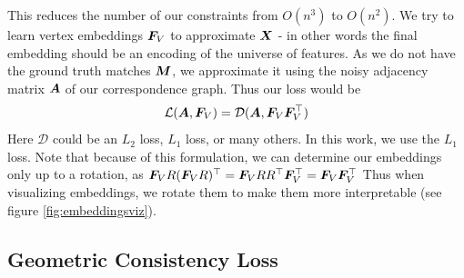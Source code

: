 \documentclass{article} %
\begin{document}
This reduces the number of our constraints from $O(n^3)$ to $O(n^2)$.
We try to learn vertex embeddings ${\bm{F}}_V$ to approximate ${\bm{X}}$ - in other words the final embedding should be an encoding of the universe of features.
As we do not have the ground truth matches ${\bm{M}}$, we approximate it using the noisy adjacency matrix ${\bm{A}}$ of our correspondence graph. Thus our loss would be 
\begin{equation}
\mathcal{L}({\bm{A}}, {\bm{F}}_V) = \mathcal{D}({\bm{A}}, {\bm{F}}_V {\bm{F}}_V^\top)
\end{equation}
Here $\mathcal{D}$ could be an $L_2$ loss, $L_1$ loss, or many others. In this work, we use the $L_1$ loss. 
Note that because of this formulation, we can determine our embeddings only up to a rotation, as
$ {\bm{F}}_V R({\bm{F}}_V R)^\top
= {\bm{F}}_V RR^\top {\bm{F}}_V^\top
= {\bm{F}}_V{\bm{F}}_V^\top
\label{eq:rotinvar} $
Thus when visualizing embeddings, we rotate them to make them more interpretable (see figure \ref{fig:embeddingsviz}).

\subsection{Geometric Consistency Loss}
\end{document}
